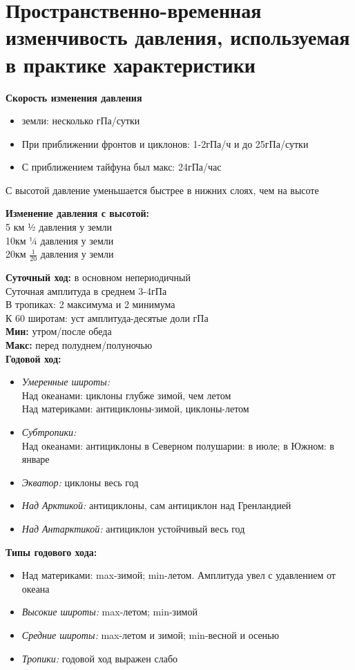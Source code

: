 
\section{Пространственно-временная изменчивость давления, используемая в практике характеристики}
\par \textbf{Скорость изменения давления} 
\begin{itemize}
	\item земли: несколько гПа/сутки
	\item При приближении фронтов и циклонов: 1-2гПа/ч и до 25гПа/сутки
	\item С приближением тайфуна был макс: 24гПа/час
\end{itemize}
С высотой давление уменьшается быстрее в нижних слоях, чем на высоте\\
\par \textbf{Изменение давления с высотой:}\\
5 км  ½ давления у земли\\
10км ¼ давления у земли\\
20км $\frac{1}{20}$ давления у земли

\textbf{Суточный ход:} в основном непериодичный\\  
Суточная амплитуда в среднем 3-4гПа\\ 
В тропиках: 2 максимума и 2 минимума\\ 
К 60 широтам: уст амплитуда-десятые доли гПа\\ 
\textbf{Мин:} утром/после обеда \\
\textbf{Макс:} перед полуднем/полуночью \\
\textbf{Годовой ход:} 
\begin{itemize} 
	\item \textit{Умеренные широты:} \\ 
	Над океанами: циклоны глубже зимой, чем летом\\ 
	Над материками: антициклоны-зимой, циклоны-летом 
	\item \textit{Субтропики:} \\ 
	Над океанами: антициклоны в Северном полушарии: в июле; в Южном: в январе
	\item \textit{Экватор:} циклоны весь год 
	\item \textit{Над Арктикой:} антициклоны, сам антициклон над Гренландией 
	\item \textit{Над Антарктикой:} антициклон устойчивый весь год 
\end{itemize} 

\par \textbf{Типы годового хода:} 
\begin{itemize} 
	\item Над материками: max-зимой; min-летом. Амплитуда увел с удавлением от океана 
	\item \textit{Высокие широты:} max-летом; min-зимой 
	\item \textit{Средние широты:} max-летом и зимой; min-весной и осенью 
	\item \textit{Тропики:} годовой ход выражен слабо 
\end{itemize}